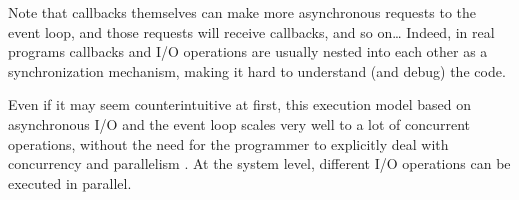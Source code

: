 Note that callbacks themselves can make more asynchronous requests to the event loop, and those requests will receive callbacks, and so on\dots{}
Indeed, in real programs callbacks and I/O operations are usually nested into each other as a synchronization mechanism, making it hard to understand (and debug) the code.

Even if it may seem counterintuitive at first, this execution model based on asynchronous I/O and the event loop scales very well to a lot of concurrent operations, without the need for the programmer to explicitly deal with concurrency and parallelism \cite{Nodejs10,NodejsPerformance14}.
At the system level, different I/O operations can be executed in parallel.
